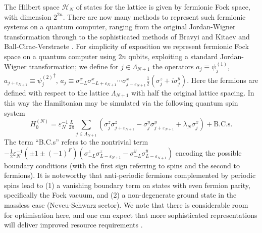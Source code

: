 \documentclass[12pt]{article}
\newcommand{\1}{\mathds{1}}
\begin{document}
The Hilbert space $\mathcal{H}_N$ of states for the lattice is given by fermionic Fock space, with dimension $2^{2n}$. There are now many methods to represent such fermionic systems on a quantum computer, ranging from the original Jordan-Wigner transformation through to the sophisticated methods of Bravyi and Kitaev and Ball-Cirac-Verstraete \cite{jordanUberPaulischeAquivalenzverbot1928,bravyiFermionicQuantumComputation2002,ballFermionsFermionFields2005,verstraeteMappingLocalHamiltonians2005}. For simplicity of exposition we represent fermionic Fock space on a quantum computer using $2n$ qubits, exploiting a standard Jordan-Wigner transformation; we define for $j\in \Lambda_{N+1}$ the operators $a_j \equiv \psi_j^{(1)}$, $a_{j+\varepsilon_{N+1}} \equiv {\psi_j^{(2)}}^\dag$, $a_j \equiv \sigma^x_{-L}\sigma_{-L+\varepsilon_{N+1}}^x\cdots \sigma^x_{j-\varepsilon_{N+1}}\tfrac{1}{2}(\sigma_j^z+i\sigma_j^y)$. Here the fermions are defined with respect to the lattice $\Lambda_{N+1}$ with half the original lattice spacing. In this way the Hamiltonian may be simulated via the following quantum spin system \cite{osborneConformal2021}
\begin{equation}\label{eq:qsham}
	H_0^{(N)} = \varepsilon_{N}^{-1}\tfrac{L}{2\pi}\sum_{j\in \Lambda_{N+1}} \left(\sigma^z_j\sigma^z_{j+\varepsilon_{N+1}} - \sigma^y_j\sigma^y_{j+\varepsilon_{N+1}} + \lambda_{N}\sigma_j^x \right)+ \text{B.C.s}.
\end{equation}
The term ``B.C.s'' refers to the nontrivial term $-\frac12\varepsilon_{N}^{-1}(\pm1 \pm(-1)^F)(\sigma^z_{-L}\sigma^z_{L-\varepsilon_{N+1}} - \sigma^y_{-L}\sigma^y_{L-\varepsilon_{N+1}})$ encoding the possible boundary conditions (with the first sign referring to spins and the second to fermions). It is noteworthy that anti-periodic fermions complemented by periodic spins lead to (1) a vanishing boundary term on states with even fermion parity, specifically the Fock vacuum, and (2) a non-degenerate ground state in the massless case (Neveu-Schwarz sector). We note that there is considerable room for optimisation here, and one can expect that more sophisticated representations will deliver improved resource requirements \cite{cadeStrategiesSolvingFermiHubbard2020}. 
\end{document}
